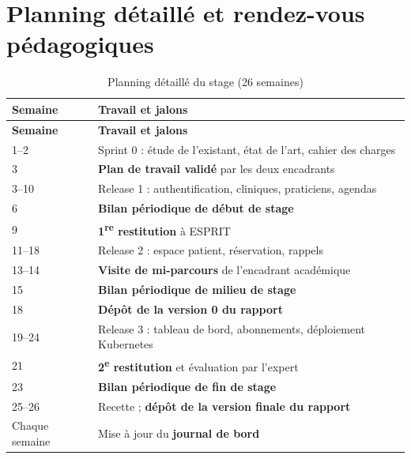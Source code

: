 \chapter{Planning détaillé et rendez-vous pédagogiques}\label{annexe:planning}

\begin{longtable}{p{2cm}p{12.6cm}}
\caption{Planning détaillé du stage (26 semaines)}\label{tab:planning}\\
\toprule
\textbf{Semaine} & \textbf{Travail et jalons} \\
\midrule
\endfirsthead
\toprule
\textbf{Semaine} & \textbf{Travail et jalons} \\
\midrule
\endhead
1--2 & Sprint 0 : étude de l'existant, état de l'art, cahier des charges \\
3 & \textbf{Plan de travail validé} par les deux encadrants \\
3--10 & Release 1 : authentification, cliniques, praticiens, agendas \\
6 & \textbf{Bilan périodique de début de stage} \\
9 & \textbf{1\textsuperscript{re} restitution} à ESPRIT \\
11--18 & Release 2 : espace patient, réservation, rappels \\
13--14 & \textbf{Visite de mi-parcours} de l'encadrant académique \\
15 & \textbf{Bilan périodique de milieu de stage} \\
18 & \textbf{Dépôt de la version 0 du rapport} \\
19--24 & Release 3 : tableau de bord, abonnements, déploiement Kubernetes \\
21 & \textbf{2\textsuperscript{e} restitution} et évaluation par l'expert \\
23 & \textbf{Bilan périodique de fin de stage} \\
25--26 & Recette ; \textbf{dépôt de la version finale du rapport} \\
Chaque semaine & Mise à jour du \textbf{journal de bord} \\
\bottomrule
\end{longtable}
